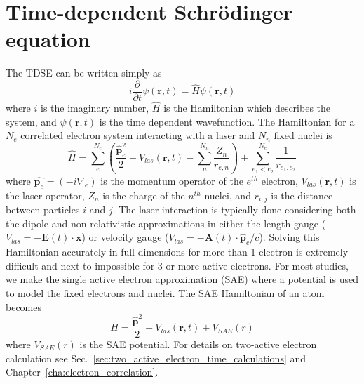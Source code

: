 \section{Time-dependent Schr\"odinger equation}
\label{sec:TDSE}
The TDSE can be written simply as
\begin{equation}
    i\frac{\partial}{\partial t}\psi(\mathbf{r},t) = \hat{H}\psi(\mathbf{r},t)
    \label{eq:TDSE}
\end{equation}
where $i$ is the imaginary number, $\hat{H}$ is the Hamiltonian which describes the system, and $\psi(\mathbf{r},t)$ is the time dependent wavefunction. The Hamiltonian for a $N_e$ correlated electron system interacting with a laser and $N_n$ fixed nuclei is
\begin{equation}
    \label{eq:atoms_and_molecules}
    \hat{H} = \sum_{e}^{N_e}\left(\frac{\hat{\mathbf{p}}^2_e}{2} + V_{las}(\mathbf{r},t) - \sum_{n}^{N_n} \frac{Z_n}{r_{e,n}}\right) + \sum_{e_1 < e_2}^{N_e}\frac{1}{r_{e_1, e_2}}
\end{equation}
where $\hat{\mathbf{p}_e}=(-i\nabla_e)$ is the momentum operator of the $e^{th}$ electron, $V_{las}(\mathbf{r},t)$ is the laser operator, $Z_n$ is the charge of the $n^{th}$ nuclei, and $r_{i,j}$ is the distance between particles $i$ and $j$. The laser interaction is typically done considering both the dipole and non-relativistic approximations in either the length gauge ($V_{las} = - \mathbf{E}(t)\cdot \mathbf{x}$) or velocity gauge ($V_{las} = - \mathbf{A}(t)\cdot \hat{\mathbf{p}}_e / c$). Solving this Hamiltonian accurately in full dimensions for more than 1 electron is extremely difficult and next to impossible for 3 or more active electrons. For most studies, we make the single active electron approximation (SAE) where a potential is used to model the fixed electrons and nuclei. The SAE Hamiltonian of an atom becomes 
\begin{equation}
    \label{eq:SAE}
    \hat{H} = \frac{\hat{\mathbf{p}}^2}{2} + V_{las}(\mathbf{r},t) + V_{SAE}(r)
\end{equation}
where $V_{SAE}(r)$ is the SAE potential. For details on two-active electron calculation see Sec.~\ref{sec:two_active_electron_time_calculations} and Chapter~\ref{cha:electron_correlation}.

